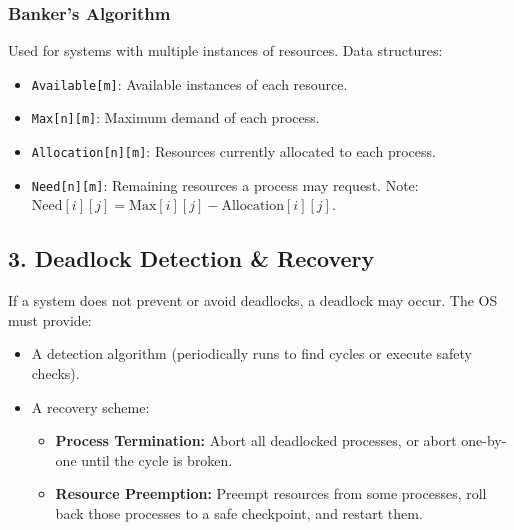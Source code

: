 \documentclass[12pt,a4paper]{article}
\begin{document}
\begin{tcolorbox}[tikzbox, title={Deadlock State Space Partitioning}]
\centering
{}
\end{tcolorbox}

\subsubsection{Banker's Algorithm}
Used for systems with multiple instances of resources. Data structures:
\begin{itemize}[leftmargin=*, itemsep=3pt]
  \item \texttt{Available[m]}: Available instances of each resource.
  \item \texttt{Max[n][m]}: Maximum demand of each process.
  \item \texttt{Allocation[n][m]}: Resources currently allocated to each process.
  \item \texttt{Need[n][m]}: Remaining resources a process may request. Note: $\text{Need}[i][j] = \text{Max}[i][j] - \text{Allocation}[i][j]$.
\end{itemize}

\subsection{3. Deadlock Detection \& Recovery}
If a system does not prevent or avoid deadlocks, a deadlock may occur. The OS must provide:
\begin{itemize}[leftmargin=*, itemsep=3pt]
  \item A detection algorithm (periodically runs to find cycles or execute safety checks).
  \item A recovery scheme:
  \begin{itemize}[leftmargin=*, itemsep=2.5pt, topsep=0pt]
    \item \textbf{Process Termination:} Abort all deadlocked processes, or abort one-by-one until the cycle is broken.
    \item \textbf{Resource Preemption:} Preempt resources from some processes, roll back those processes to a safe checkpoint, and restart them.
    \end{itemize}
  \end{itemize}
\end{document}
